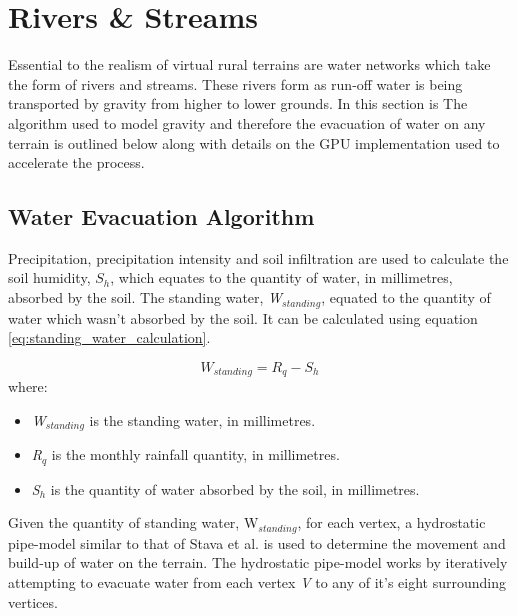\section{Rivers \& Streams}

Essential to the realism of virtual rural terrains are water networks which take the form of rivers and streams. These rivers form as run-off water is being transported by gravity from higher to lower grounds. In this section is  The algorithm used to model gravity and therefore the evacuation of water on any terrain is outlined below along with details on the GPU implementation used to accelerate the process.

\subsection{Water Evacuation Algorithm} 

Precipitation, precipitation intensity and soil infiltration are used to calculate the soil humidity, $S_{h}$, which equates to the quantity of water, in millimetres, absorbed by the soil. The standing water, \textit{W$_{standing}$}, equated to the quantity of water which wasn't absorbed by the soil. It can be calculated using equation \ref{eq:standing_water_calculation}.

\begin{equation} \label{eq:standing_water_calculation}
	W_{standing} = R_{q} - S_{h}
\end{equation}
where:
\begin{itemize}
\item \textit{W$_{standing}$} is the standing water, in millimetres.\\
\item \textit{R$_{q}$} is the monthly rainfall quantity, in millimetres.\\
\item \textit{S$_{h}$} is the quantity of water absorbed by the soil, in millimetres.\\
\end{itemize}

Given the quantity of standing water, W$_{standing}$, for each vertex, a hydrostatic pipe-model similar to that of Stava et al. \cite{StAva2008} is used to determine the movement and build-up of water on the terrain. The hydrostatic pipe-model works by iteratively attempting to evacuate water from each vertex \textit{V} to any of it's eight surrounding vertices.\\


